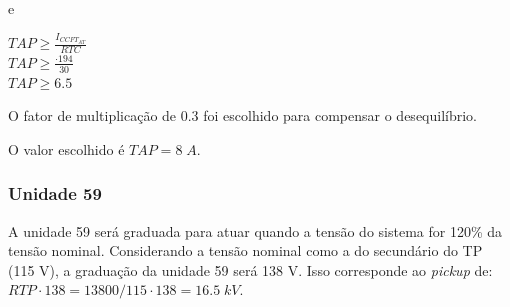e

\begin{center}
$TAP \geq \frac{I_{CCFT_{AT}}}{RTC}$ \\ \vspace{5pt}
$TAP \geq \frac{\cdot 194}{30} $ \\ \vspace{5pt}
$TAP \geq 6.5$ \\ \vspace{5pt}
\end{center}    

O fator de multiplicação de 0.3 foi escolhido para compensar o desequilíbrio.

O valor escolhido é $TAP = 8 \; A$.

\subsubsection{Unidade 59}

A unidade 59 será graduada para atuar quando a tensão do sistema for 120\% da tensão nominal. Considerando a tensão nominal como a do secundário do TP (115 V), a graduação da unidade 59 será 138 V. Isso corresponde ao \textit{pickup} de: $RTP \cdot 138 = 13800/115 \cdot  138 = 16.5 \; kV$.

\newpage



\newpage